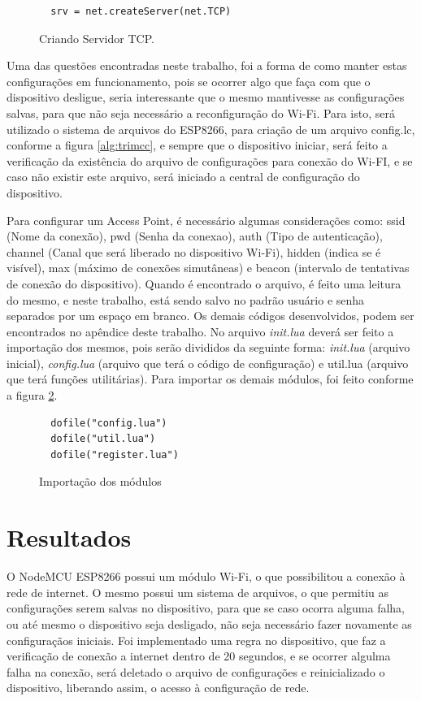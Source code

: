 \documentclass[journal]{IEEEtran}
\begin{document}
\begin{figure}[h]
\centering

\begin{lstlisting}
  srv = net.createServer(net.TCP)
\end{lstlisting}

\caption{Criando Servidor TCP.}
\label{alg:TCPSERVER}
\end{figure}

Uma das questões encontradas neste trabalho, foi a forma de como manter estas configurações em funcionamento, pois se ocorrer algo que faça com que o dispositivo desligue, seria interessante que o mesmo mantivesse as configurações salvas, para que não seja necessário a reconfiguração do Wi-Fi. Para isto, será utilizado o sistema de arquivos do ESP8266, para criação de um arquivo config.lc, conforme a figura \ref{alg:trimcc}, e sempre que o dispositivo iniciar, será feito a verificação da existência do arquivo de configurações para conexão do Wi-FI, e se caso não existir este arquivo, será iniciado a central de configuração do dispositivo.

Para configurar um Access Point, é necessário algumas considerações como: ssid (Nome da conexão), pwd (Senha da conexao), auth (Tipo de autenticação), channel (Canal que será liberado no dispositivo Wi-Fi), hidden (indica se é visível), max (máximo de conexões simutâneas) e beacon (intervalo de tentativas de conexão do dispositivo). Quando é encontrado o arquivo, é feito uma leitura do mesmo, e neste trabalho, está sendo salvo no padrão usuário e senha separados por um espaço em branco. Os demais códigos desenvolvidos, podem ser encontrados no apêndice deste trabalho. No arquivo \emph{init.lua} deverá ser feito a importação dos mesmos, pois serão divididos da seguinte forma: \emph{init.lua} (arquivo inicial), \emph{config.lua} (arquivo que terá o código de configuração) e util.lua (arquivo que terá funções utilitárias). Para importar os demais módulos, foi feito conforme a figura \ref{alg:importsdofile}.

\begin{figure}[H]
\begin{lstlisting} 
  dofile("config.lua")
  dofile("util.lua")
  dofile("register.lua")
\end{lstlisting}

\caption{Importação dos módulos}
\label{alg:importsdofile}
\end{figure}


\section{Resultados}
O NodeMCU ESP8266 possui um módulo Wi-Fi, o que possibilitou a conexão à rede de internet. O mesmo possui um sistema de arquivos, o que permitiu as configurações serem salvas no dispositivo, para que se caso ocorra alguma falha, ou até mesmo o dispositivo seja desligado, não seja necessário fazer novamente as configuraçãos iniciais. Foi implementado uma regra no dispositivo, que faz a verificação de conexão a internet dentro de 20 segundos, e se ocorrer algulma falha na conexão, será deletado o arquivo de configurações e reinicializado o dispositivo, liberando assim, o acesso à configuração de rede.
\end{document}
